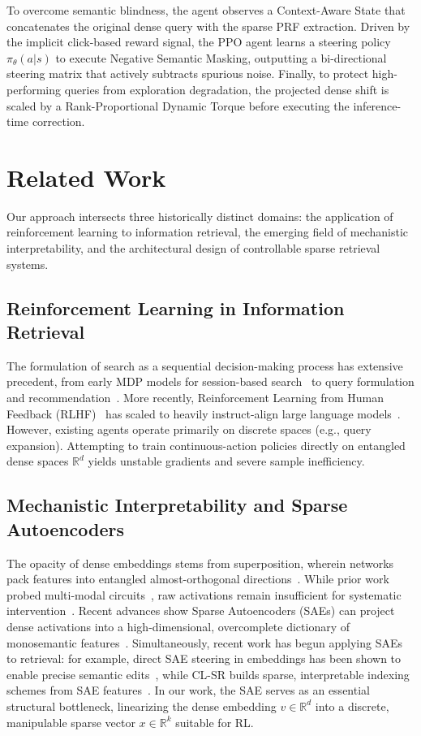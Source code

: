 To overcome semantic blindness, the agent observes a Context-Aware State that concatenates the original dense query with the sparse PRF extraction. Driven by the implicit click-based reward signal, the PPO agent learns a steering policy $\pi_\theta(a|s)$ to execute Negative Semantic Masking, outputting a bi-directional steering matrix that actively subtracts spurious noise. Finally, to protect high-performing queries from exploration degradation, the projected dense shift is scaled by a Rank-Proportional Dynamic Torque before executing the inference-time correction.

\section{Related Work}
Our approach intersects three historically distinct domains: the application of reinforcement learning to information retrieval, the emerging field of mechanistic interpretability, and the architectural design of controllable sparse retrieval systems.

\subsection{Reinforcement Learning in Information Retrieval}
The formulation of search as a sequential decision-making process has extensive precedent, from early MDP models for session-based search~\citep{hofmann2013, wei2017} to query formulation and recommendation~\citep{nogueira2017, ouyang2021}. More recently, Reinforcement Learning from Human Feedback (RLHF)~\citep{christiano2017} has scaled to heavily instruct-align large language models~\citep{ouyang2022, ziegler2019}. However, existing agents operate primarily on discrete spaces (e.g., query expansion). Attempting to train continuous-action policies directly on entangled dense spaces $\mathbb{R}^d$ yields unstable gradients and severe sample inefficiency.

\subsection{Mechanistic Interpretability and Sparse Autoencoders}
The opacity of dense embeddings stems from superposition, wherein networks pack features into entangled almost-orthogonal directions~\citep{elhage2022}. While prior work probed multi-modal circuits~\citep{olah2020, meng2022}, raw activations remain insufficient for systematic intervention~\citep{lee2023}. Recent advances show Sparse Autoencoders (SAEs) can project dense activations into a high-dimensional, overcomplete dictionary of monosemantic features~\citep{bricken2023, gao2024scaling}. Simultaneously, recent work has begun applying SAEs to retrieval: for example, direct SAE steering in embeddings has been shown to enable precise semantic edits~\citep{makelov2024}, while CL-SR builds sparse, interpretable indexing schemes from SAE features~\citep{liu2025clsr}. In our work, the SAE serves as an essential structural bottleneck, linearizing the dense embedding $v \in \mathbb{R}^d$ into a discrete, manipulable sparse vector $x \in \mathbb{R}^k$ suitable for RL.

